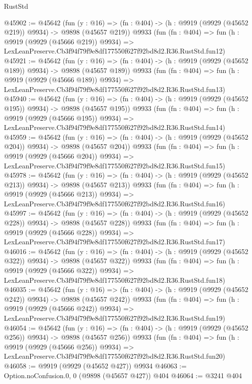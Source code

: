 \begin{lexlean}{RustStd}
\begin{coremodule}
@45902 := @45642
    (fun (y : @16) => (fn : @404) -> (h : @9919 (@9929 (@45652 @219)) @9934) -> @9898 (@45657 @219))
    @9933
    (fun (fn : @404) =>
    fun (h : @9919 (@9929 (@45666 @219)) @9934) =>
    LexLeanPreserve.Cb3f94f79f9e8df177550f627f92bd8d2.R36.RustStd.fun12)
@45921 := @45642
    (fun (y : @16) => (fn : @404) -> (h : @9919 (@9929 (@45652 @189)) @9934) -> @9898 (@45657 @189))
    @9933
    (fun (fn : @404) =>
    fun (h : @9919 (@9929 (@45666 @189)) @9934) =>
    LexLeanPreserve.Cb3f94f79f9e8df177550f627f92bd8d2.R36.RustStd.fun13)
@45940 := @45642
    (fun (y : @16) => (fn : @404) -> (h : @9919 (@9929 (@45652 @195)) @9934) -> @9898 (@45657 @195))
    @9933
    (fun (fn : @404) =>
    fun (h : @9919 (@9929 (@45666 @195)) @9934) =>
    LexLeanPreserve.Cb3f94f79f9e8df177550f627f92bd8d2.R36.RustStd.fun14)
@45959 := @45642
    (fun (y : @16) => (fn : @404) -> (h : @9919 (@9929 (@45652 @204)) @9934) -> @9898 (@45657 @204))
    @9933
    (fun (fn : @404) =>
    fun (h : @9919 (@9929 (@45666 @204)) @9934) =>
    LexLeanPreserve.Cb3f94f79f9e8df177550f627f92bd8d2.R36.RustStd.fun15)
@45978 := @45642
    (fun (y : @16) => (fn : @404) -> (h : @9919 (@9929 (@45652 @213)) @9934) -> @9898 (@45657 @213))
    @9933
    (fun (fn : @404) =>
    fun (h : @9919 (@9929 (@45666 @213)) @9934) =>
    LexLeanPreserve.Cb3f94f79f9e8df177550f627f92bd8d2.R36.RustStd.fun16)
@45997 := @45642
    (fun (y : @16) => (fn : @404) -> (h : @9919 (@9929 (@45652 @228)) @9934) -> @9898 (@45657 @228))
    @9933
    (fun (fn : @404) =>
    fun (h : @9919 (@9929 (@45666 @228)) @9934) =>
    LexLeanPreserve.Cb3f94f79f9e8df177550f627f92bd8d2.R36.RustStd.fun17)
@46016 := @45642
    (fun (y : @16) => (fn : @404) -> (h : @9919 (@9929 (@45652 @322)) @9934) -> @9898 (@45657 @322))
    @9933
    (fun (fn : @404) =>
    fun (h : @9919 (@9929 (@45666 @322)) @9934) =>
    LexLeanPreserve.Cb3f94f79f9e8df177550f627f92bd8d2.R36.RustStd.fun18)
@46035 := @45642
    (fun (y : @16) => (fn : @404) -> (h : @9919 (@9929 (@45652 @242)) @9934) -> @9898 (@45657 @242))
    @9933
    (fun (fn : @404) =>
    fun (h : @9919 (@9929 (@45666 @242)) @9934) =>
    LexLeanPreserve.Cb3f94f79f9e8df177550f627f92bd8d2.R36.RustStd.fun19)
@46054 := @45642
    (fun (y : @16) => (fn : @404) -> (h : @9919 (@9929 (@45652 @256)) @9934) -> @9898 (@45657 @256))
    @9933
    (fun (fn : @404) =>
    fun (h : @9919 (@9929 (@45666 @256)) @9934) =>
    LexLeanPreserve.Cb3f94f79f9e8df177550f627f92bd8d2.R36.RustStd.fun20)
@46058 := @9919 (@9929 (@45652 @427)) @9934
@46063 := Option.noConfusion.{0, 0} (@9898 (@45657 @427)) @404
@46064 := @3241 @404

\end{coremodule}
\end{lexlean}

